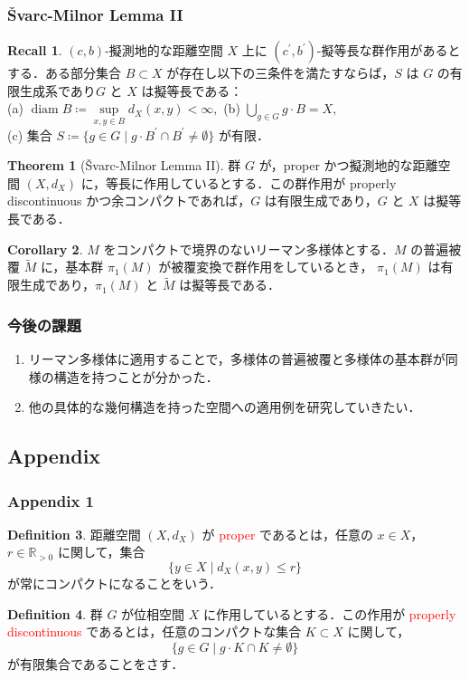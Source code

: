 \documentclass[10pt]{beamer}
\DeclareMathOperator{\diam}{diam}
\theoremstyle{definition}
\newtheorem{dfn}{Definition}[section]
\newtheorem{thm}[dfn]{Theorem}
\newtheorem{cor}[dfn]{Corollary}
\newtheorem*{rec}{Recall}
\begin{document}
\begin{frame}
    \frametitle{Švarc-Milnor Lemma II}

    \begin{rec}
    $(c,b)$-擬測地的な距離空間 $X$ 上に $(c^\prime,b^\prime)$-擬等長な群作用があるとする．ある部分集合 $B\subset X$ が存在し以下の三条件を満たすならば，$S$ は $G$ の有限生成系であり$G$ と $X$ は擬等長である：\\
    (a) $\diam B\coloneqq\underset{x,y\in B}{\sup}d_X(x,y)<\infty,$
    (b) $\bigcup_{g\in G}g\cdot B=X,$\\
    (c) 集合 $S\coloneqq\{g\in G\mid g\cdot B^\prime \cap B^\prime \neq \emptyset\}$ が有限．
    \end{rec}

    \begin{thm}[Švarc-Milnor Lemma II]
    群 $G$ が，proper かつ擬測地的な距離空間 $(X,d_X)$ に，等長に作用しているとする．この群作用が properly discontinuous かつ余コンパクトであれば，$G$ は有限生成であり，$G$ と $X$ は擬等長である．
    \end{thm}

    \begin{cor}
        $M$ をコンパクトで境界のないリーマン多様体とする．$M$ の普遍被覆 $\widetilde{M}$ に，基本群 $\pi_1(M)$ が被覆変換で群作用をしているとき， $\pi_1(M)$ は有限生成であり，$\pi_1(M)$ と $\widetilde{M}$ は擬等長である．
    \end{cor}
\end{frame}

\begin{frame}
    \frametitle{今後の課題}
    \begin{enumerate}
        \item リーマン多様体に適用することで，多様体の普遍被覆と多様体の基本群が同様の構造を持つことが分かった．
        \item 他の具体的な幾何構造を持った空間への適用例を研究していきたい．
    \end{enumerate}
\end{frame}

\begin{frame}
    \section{Appendix}
\end{frame}

\begin{frame}
    \frametitle{Appendix 1}
    \begin{dfn}
        距離空間 $(X,d_X)$ が \textcolor{red}{proper} であるとは，任意の $x\in X$，$r\in \mathbb{R}_{>0}$ に関して，集合
        $$\{y\in X\mid d_X(x,y)\leq r\}$$
        が常にコンパクトになることをいう．
    \end{dfn}

    \begin{dfn}
        群 $G$ が位相空間 $X$ に作用しているとする．この作用が \textcolor{red}{properly discontinuous} であるとは，任意のコンパクトな集合 $K\subset X$ に関して，
        $$\{g\in G\mid g\cdot K\cap K\neq \emptyset\}$$
        が有限集合であることをさす．
    \end{dfn}
\end{frame}
\end{document}

